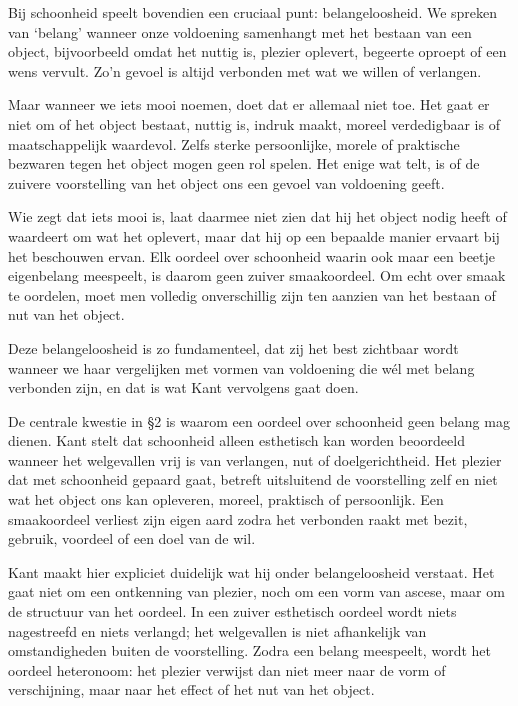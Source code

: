 \begin{mdframed}[leftmargin=0pt,rightmargin=0pt,backgroundcolor=blue!6,linecolor=white,innertopmargin=6pt,innerbottommargin=6pt]

Bij schoonheid speelt bovendien een cruciaal punt: belangeloosheid. We spreken van ‘belang’ wanneer onze voldoening samenhangt met het bestaan van een object, bijvoorbeeld omdat het nuttig is, plezier oplevert, begeerte oproept of een wens vervult. Zo’n gevoel is altijd verbonden met wat we willen of verlangen.

Maar wanneer we iets mooi noemen, doet dat er allemaal niet toe. Het gaat er niet om of het object bestaat, nuttig is, indruk maakt, moreel verdedigbaar is of maatschappelijk waardevol. Zelfs sterke persoonlijke, morele of praktische bezwaren tegen het object mogen geen rol spelen. Het enige wat telt, is of de zuivere voorstelling van het object ons een gevoel van voldoening geeft.

Wie zegt dat iets mooi is, laat daarmee niet zien dat hij het object nodig heeft of waardeert om wat het oplevert, maar dat hij op een bepaalde manier ervaart bij het beschouwen ervan. Elk oordeel over schoonheid waarin ook maar een beetje eigenbelang meespeelt, is daarom geen zuiver smaakoordeel. Om echt over smaak te oordelen, moet men volledig onverschillig zijn ten aanzien van het bestaan of nut van het object.

Deze belangeloosheid is zo fundamenteel, dat zij het best zichtbaar wordt wanneer we haar vergelijken met vormen van voldoening die wél met belang verbonden zijn, en dat is wat Kant vervolgens gaat doen.

\bigskip

De centrale kwestie in §2 is waarom een oordeel over schoonheid geen belang mag dienen. Kant stelt dat schoonheid alleen esthetisch kan worden beoordeeld wanneer het welgevallen vrij is van verlangen, nut of doelgerichtheid. Het plezier dat met schoonheid gepaard gaat, betreft uitsluitend de voorstelling zelf en niet wat het object ons kan opleveren, moreel, praktisch of persoonlijk. Een smaakoordeel verliest zijn eigen aard zodra het verbonden raakt met bezit, gebruik, voordeel of een doel van de wil.

Kant maakt hier expliciet duidelijk wat hij onder belangeloosheid verstaat. Het gaat niet om een ontkenning van plezier, noch om een vorm van ascese, maar om de structuur van het oordeel. In een zuiver esthetisch oordeel wordt niets nagestreefd en niets verlangd; het welgevallen is niet afhankelijk van omstandigheden buiten de voorstelling. Zodra een belang meespeelt, wordt het oordeel heteronoom: het plezier verwijst dan niet meer naar de vorm of verschijning, maar naar het effect of het nut van het object.


\end{mdframed}
